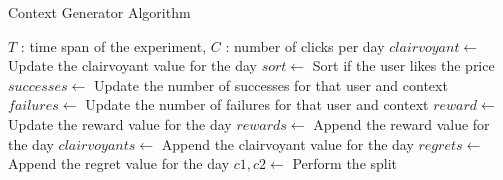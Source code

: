 \begin{algorithm}
	\caption{Context Generator Algorithm}
	\begin{algorithmic}[1]
		\renewcommand{\algorithmicrequire}{\textbf{Input:}}
		\REQUIRE $T$ : time span of the experiment, $C$ : number of clicks per day
		\STATE $clairvoyant \gets ${ Update the clairvoyant value for the day}
		\STATE $sort \gets ${ Sort if the user likes the price}
		\STATE $successes \gets ${ Update the number of successes for that user and context}
		\STATE $failures \gets ${ Update the number of failures for that user and context}
		\ENDFOR
		\STATE $reward \gets ${ Update the reward value for the day}
		\ENDFOR
		\STATE $rewards \gets ${ Append the reward value for the day}
		\STATE $clairvoyants \gets ${ Append the clairvoyant value for the day}
		\STATE $regrets \gets ${ Append the regret value for the day}
		\ENDFOR
		\STATE $c1, c2 \gets${ Perform the split}
		\ENDIF
		\ENDFOR
		\ENDFOR	
		\ENDIF
		\ENDFOR
	\end{algorithmic}
\end{algorithm}
\newpage
